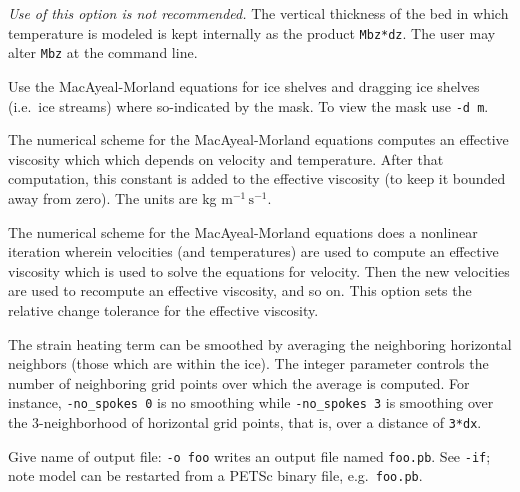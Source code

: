 \documentclass[11pt,final]{amsart}
\begin{document}
  \emph{Use of this option is not recommended.}  The vertical thickness of the bed in which temperature is modeled is kept internally as the product \verb|Mbz*dz|.  The user may alter \verb|Mbz| at the command line.






  Use the MacAyeal-Morland equations for ice shelves and dragging ice shelves (i.e.~ice streams) where so-indicated by the mask.  To view the mask use \verb|-d m|.

  The numerical scheme for the MacAyeal-Morland equations computes an effective viscosity which which depends on velocity and temperature.  After that computation, this constant is added to the effective viscosity (to keep it bounded away from zero).  The units are kg $\text{m}^{-1}\,\text{s}^{-1}$.

  The numerical scheme for the MacAyeal-Morland equations does a nonlinear iteration wherein velocities (and temperatures) are used to compute an effective viscosity which is used to solve the equations for velocity.  Then the new velocities are used to recompute an effective viscosity, and so on.  This option sets the relative change tolerance for the effective viscosity.






  The strain heating term can be smoothed by averaging the neighboring horizontal neighbors (those which are within the ice).  The integer parameter controls the number of neighboring grid points over which the average is computed.  For instance, \verb|-no_spokes 0| is no smoothing while \verb|-no_spokes 3| is smoothing over the 3-neighborhood of horizontal grid points, that is, over a distance of \verb|3*dx|.


 Give name of output file: \verb|-o foo| writes an output file named \verb|foo.pb|.  See \verb|-if|; note model can be restarted from a PETSc binary file, e.g.~\verb|foo.pb|.
\end{document}
